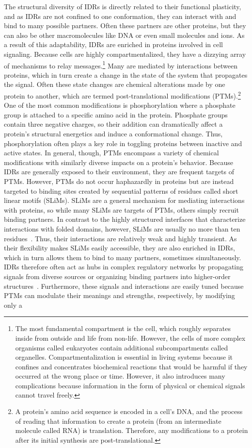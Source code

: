 The structural diversity of IDRs is directly related to their functional plasticity, and as IDRs are not confined to one conformation, they can interact with and bind to many possible partners. Often these partners are other proteins, but they can also be other macromolecules like DNA or even small molecules and ions. As a result of this adaptability, IDRs are enriched in proteins involved in cell signaling. Because cells are highly compartmentalized, they have a dizzying array of mechanisms to relay messages.\footnote{The most fundamental compartment is the cell, which roughly separates inside from outside and life from non-life. However, the cells of more complex organisms called eukaryotes contain additional subcompartments called organelles. Compartmentalization is essential in living systems because it confines and concentrates biochemical reactions that would be harmful if they occurred at the wrong place or time. However, it also introduces many complications because information in the form of physical or chemical signals cannot travel freely.} Many are mediated by interactions between proteins, which in turn create a change in the state of the system that propagates the signal. Often these state changes are chemical alterations made by one protein to another, which are termed post-translational modifications (PTMs).\footnote{A protein's amino acid sequence is encoded in a cell's DNA, and the process of reading that information to create a protein (from an intermediate molecule called RNA) is translation. Therefore, any modifications to a protein after its initial synthesis are post-translational.} One of the most common modifications is phosphorylation where a phosphate group is attached to a specific amino acid in the protein. Phosphate groups contain three negative charges, so their addition can dramatically affect a protein's structural energetics and induce a conformational change. Thus, phosphorylation often plays a key role in toggling proteins between inactive and active states. In general, though, PTMs encompass a variety of chemical modifications with similarly diverse impacts on a protein's behavior. Because IDRs are generally exposed to their environment, they are frequent targets of PTMs. However, PTMs do not occur haphazardly in proteins but are instead targeted to binding sites created by sequential patterns of residues called short linear motifs (SLiMs). SLiMs are a general mechanism for mediating interactions with proteins, so while many SLiMs are targets of PTMs, others simply recruit binding partners. In contrast to the highly structured interfaces that characterize interactions with folded domains, however, SLiMs are usually no more than ten residues~\cite{Tompa2014}. Thus, their interactions are relatively weak and highly transient. As their flexibility makes SLiMs easily accessible, they are also enriched in IDRs, which in turn allows them to bind to many partners, sometimes simultaneously. IDRs therefore often act as hubs in complex regulatory networks by propagating signals from diverse sources or organizing binding partners into higher-order structures~\cite{Dunker2005, Buljan2012, Wright2014}. Furthermore, these signals and interactions are easily tuned because PTMs can modulate their meanings and strengths, respectively, by modifying only a 